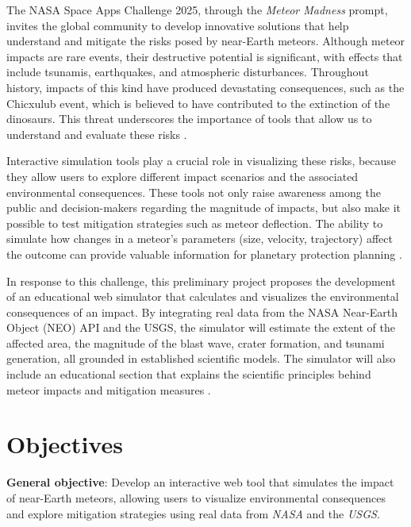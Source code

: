 \documentclass[conference]{IEEEtran}
\begin{document}
The NASA Space Apps Challenge 2025, through the \textit{Meteor Madness} prompt,
invites the global community to develop innovative solutions that help
understand and mitigate the risks posed by near-Earth meteors. Although
meteor impacts are rare events, their destructive potential is significant,
with effects that include tsunamis, earthquakes, and atmospheric disturbances.
Throughout history, impacts of this kind have produced devastating
consequences, such as the Chicxulub event, which is believed to have
contributed to the extinction of the dinosaurs. This threat underscores the
importance of tools that allow us to understand and evaluate these risks
\cite{ward2000,melosh1989}.

Interactive simulation tools play a crucial role in visualizing these risks,
because they allow users to explore different impact scenarios and the
associated environmental consequences. These tools not only raise awareness
among the public and decision-makers regarding the magnitude of impacts, but
also make it possible to test mitigation strategies such as meteor
deflection. The ability to simulate how changes in a meteor's parameters
(size, velocity, trajectory) affect the outcome can provide valuable
information for planetary protection planning \cite{collins2005}.

In response to this challenge, this preliminary project proposes the
development of an educational web simulator that calculates and visualizes the
environmental consequences of an impact. By integrating real data from the NASA
Near-Earth Object (NEO) API and the USGS, the simulator will estimate the
extent of the affected area, the magnitude of the blast wave, crater formation,
and tsunami generation, all grounded in established scientific models. The
simulator will also include an educational section that explains the scientific
principles behind meteor impacts and mitigation measures
\cite{collins2005,wuennemann2010}.


\section{Objectives}

\textbf{General objective}: Develop an interactive web tool that simulates the
impact of near-Earth meteors, allowing users to visualize environmental
consequences and explore mitigation strategies using real data from
\textit{NASA} and the \textit{USGS}.
\end{document}
